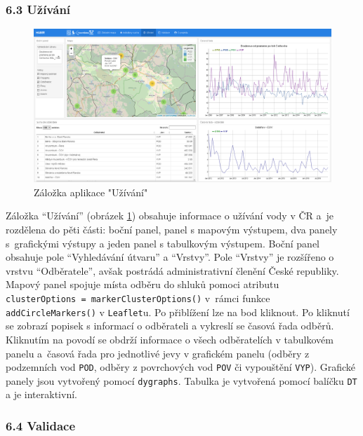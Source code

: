 \documentclass[12pt,]{article}
\begin{document}
\subsubsection{6.3 Užívání}\label{uzivani}

\begin{figure}[H]
      \includegraphics[width=\textwidth]{fig/P_uzivani}
      \caption{Záložka aplikace "Užívání"}
      \label{fig:ch5.5}
\end{figure}

\vspace*{-0.3cm}

\qquad Záložka \enquote{Užívání} (obrázek \ref{fig:ch5.5}) obsahuje
informace o užívání vody v ČR a~je rozdělena do pěti části: boční panel,
panel s mapovým výstupem, dva panely s~grafickými výstupy a jeden panel
s tabulkovým výstupem. Boční panel obsahuje pole \enquote{Vyhledávání
útvaru} a \enquote{Vrstvy}. Pole \enquote{Vrstvy} je rozšířeno o vrstvu
\enquote{Odběratele}, avšak postrádá administrativní členění České
republiky. Mapový panel spojuje místa odběru do shluků pomoci atributu
\texttt{clusterOptions\ =\ markerClusterOptions()} v~rámci funkce
\texttt{addCircleMarkers()} v \texttt{Leaflet}u. Po přiblížení lze na
bod kliknout. Po kliknutí se zobrazí popisek s informací o odběrateli a
vykreslí se časová řada odběrů. Kliknutím na povodí se obdrží informace
o všech odběratelích v tabulkovém panelu a~časová řada pro jednotlivé
jevy v grafickém panelu (odběry z podzemních vod \texttt{POD}, odběry z
povrchových vod \texttt{POV} či vypouštění \texttt{VYP}). Grafické
panely jsou vytvořený pomocí \texttt{dygraphs}. Tabulka je vytvořená
pomocí balíčku \texttt{DT} a je interaktivní.

\subsubsection{6.4 Validace}\label{validace}
\end{document}
